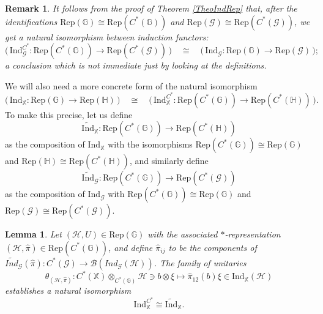 \documentclass[reqno]{amsart}
\numberwithin{equation}{section}
\newtheorem{Lem}[Theorem]{Lemma}
\newtheorem{Rem}[Theorem]{Remark}
\newcommand{\mcB}{\mathcal{B}}
\newcommand{\G}{\mathbb{G}}
\newcommand{\X}{\mathbb{X}}
\newcommand{\msG}{\mathscr{G}}
\newcommand{\Rep}{\mathrm{Rep}}
\newcommand{\Ind}{\mathrm{Ind}}
\newcommand{\mc}{\mathcal}
\newcommand{\HH}{\mathbb{H}}
\newcommand{\GG}{\mathbb{G}}
\begin{document}
\begin{Rem}
It follows from the proof of Theorem \ref{TheoIndRep} that, after the identifications $\Rep(\G)\cong \Rep(C^*(\G))$ and  $\Rep(\msG)\cong \Rep(C^*(\msG))$, we get a natural isomorphism between induction functors:
\[
\bigl(\,\Ind^{C^*}_{\msG}\colon \Rep(C^*(\G))\rightarrow \Rep(C^*(\msG))\,\bigr)\quad \cong \quad \bigl(\,\Ind_{\msG}\colon \Rep(\G)\rightarrow \Rep(\msG)\,\bigr);
\] 
a conclusion which is not immediate just by looking at the definitions.
\end{Rem}

We will also need a more concrete form of the  natural isomorphism 
\[
\bigl(\,\Ind_{\X}\colon \Rep(\GG)\rightarrow \Rep(\HH) \,\bigr)
\quad \cong \quad 
\bigl(\, \Ind_{\X}^{C^*}\colon \Rep(C^*(\GG))\rightarrow \Rep(C^*(\HH))\,\bigr).
\] 
To make this precise, let us define 
\begin{equation}
\widetilde{\Ind}_{\X}\colon \Rep(C^*(\GG))\rightarrow \Rep(C^*(\HH))
\end{equation}
as the composition of $\Ind_{\X}$ with the isomorphisms $\Rep(C^*(\GG))\cong \Rep(\GG)$ and  $\Rep(\HH)\cong \Rep(C^*(\HH))$, and similarly define 
\begin{equation}
\widetilde{\Ind}_{\msG}\colon \Rep(C^*(\GG))\rightarrow \Rep(C^*(\msG))
\end{equation}
as the composition of $\Ind_{\msG}$ with $\Rep(C^*(\G))\cong \Rep(\GG)$ and $\Rep(\msG)\cong \Rep(C^*(\msG))$.

\begin{Lem}\label{lemma9}
Let $(\mc{H},U)\in \Rep(\G)$ with the associated $*$-representation $(\mc{H},\hat{\pi})\in \Rep(C^*(\G))$, and define $\hat{\pi}_{ij}$ to be the components of $\widetilde{Ind}_{\msG}(\hat{\pi})\colon C^*(\msG)\rightarrow \mcB(Ind_{\msG}(\mc{H}))$. The family of unitaries
\[
\theta_{(\mc{H},\hat{\pi})}\colon 
C^*(\X)\otimes_{C^*(\G)}\mc{H} \ni b\otimes\xi\mapsto \hat{\pi}_{12}(b)\xi\in \Ind_{\X}(\mc{H})
\]
establishes a natural isomorphism 
\[
\Ind_{\X}^{C^*}\cong \widetilde{\Ind}_{\X}.
\]
\end{Lem}
\end{document}
